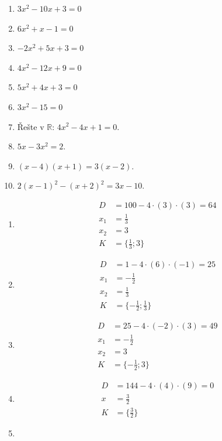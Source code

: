 \documentclass[11pt,a4paper]{article}
\begin{document}
\begin{zadaniReseniBox}[title={Domácí úkol}]
\begin{enumerate}[label=\alph*),itemsep=2pt]
\item $3x^{2} - 10x + 3=0$
\item $6x^{2} + x - 1=0$
\item $- 2x^{2} + 5x + 3=0$
\item $4x^{2} - 12x + 9=0$
\item $5x^{2} + 4x + 3=0$
\item $3x^{2} - 15=0$
\item Řešte v $\mathbb R$: $4x^{2} - 4x + 1=0$.

\item $5x-3x^2=2$.
\item $(x-4)(x+1)=3(x-2)$.
\item $2(x-1)^2-(x+2)^2=3x-10$.
\end{enumerate}
\tcblower
\begin{enumerate}[label=\alph*),itemsep=2pt]
\item
\[\begin{aligned}
D&=100-4\cdot(3)\cdot(3)=64\\[2pt]
x_1&=\frac{1}{3}\\[2pt]
x_2&=3\\[2pt]
K&=\{\frac{1}{3};3\}
\end{aligned}\]
\item
\[\begin{aligned}
D&=1-4\cdot(6)\cdot(-1)=25\\[2pt]
x_1&=- \frac{1}{2}\\[2pt]
x_2&=\frac{1}{3}\\[2pt]
K&=\{- \frac{1}{2};\frac{1}{3}\}
\end{aligned}\]
\item
\[\begin{aligned}
D&=25-4\cdot(-2)\cdot(3)=49\\[2pt]
x_1&=- \frac{1}{2}\\[2pt]
x_2&=3\\[2pt]
K&=\{- \frac{1}{2};3\}
\end{aligned}\]
\item
\[\begin{aligned}
D&=144-4\cdot(4)\cdot(9)=0\\[2pt]
x&=\frac{3}{2}\\[2pt]
K&=\{\frac{3}{2}\}
\end{aligned}\]
\item
\[\begin{aligned}

\end{aligned}\]
\end{enumerate}
\end{zadaniReseniBox}
\end{document}
